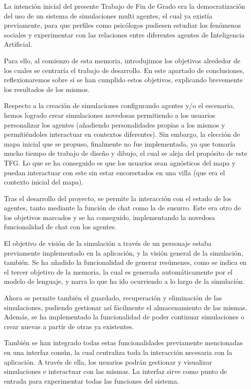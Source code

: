 La intención inicial del presente Trabajo de Fin de Grado era la democratización del uso de un sistema de simulaciones multi agentes, el cual ya existía previamente, para que perfiles como psicólogos pudiesen estudiar los fenómenos sociales y experimentar con las relaciones entre diferentes agentes de Inteligencia Artificial.

Para ello, al comienzo de esta memoria, introdujimos los objetivos alrededor de los cuales se centraría el trabajo de desarrollo. En este apartado de conclusiones, reflexionaremos sobre si se han cumplido estos objetivos, explicando brevemente los resultados de los mismos.

Respecto a la creación de simulaciones configurando agentes y/o el escenario, hemos logrado crear simulaciones novedosas permitiendo a los usuarios personalizar los agentes (añadiendo personalidades propias a los mismos y permitiéndoles interactuar en contextos diferentes). Sin embargo, la elección de mapa inicial que se propuso, finalmente no fue implementada, ya que tomaría mucho tiempo de trabajo de diseño y dibujo, el cual se aleja del propósito de este TFG. Lo que se ha conseguido es que los usuarios sean agnósticos del mapa y puedan interactuar con este sin estar encorsetados en una villa (que era el contexto inicial del mapa).

Tras el desarrollo del proyecto, se permite la interacción con el estado de los agentes, tanto mediante la función de chat como la de susurro. Este era otro de los objetivos marcados y se ha conseguido, implementando la novedosa funcionalidad de chat con los agentes.

El objetivo de visión de la simulación a través de un personaje estaba previamente implementado en la aplicación, y la visión general de la simulación, también. Se ha añadido la funcionalidad de generar resúmenes, como se indica en el tercer objetivo de la memoria, la cual es generada automáticamente por el modelo de lenguaje, y narra lo que ha ido ocurriendo a lo largo de la simulación.

Ahora se permite también el guardado, recuperación y eliminación de las simulaciones, pudiendo gestionar así fácilmente el almacenamiento de las mismas. Además, se ha implementado la funcionalidad de poder continuar simulaciones o crear nuevas a partir de otras ya existentes.

También se han integrado todas estas funcionalidades previamente mencionadas en una interfaz común, la cual centraliza toda la interacción necesaria con la aplicación. A través de ella, los usuarios podrán gestionar y visualizar simulaciones e interactuar con las mismas. La interfaz sirve como punto de entrada para experimentar todas las funciones del sistema.


